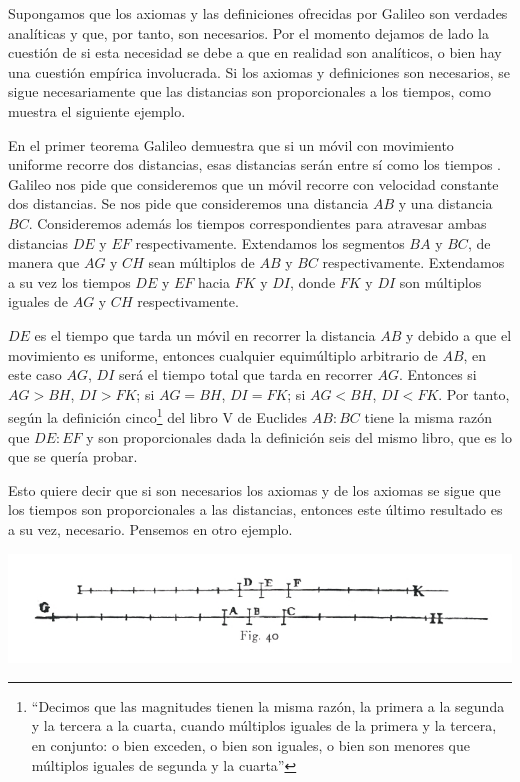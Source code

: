Supongamos que los axiomas y las definiciones ofrecidas por Galileo son verdades analíticas y que, por tanto, son necesarios. Por el momento dejamos de lado la cuestión de si esta necesidad se debe a que en realidad son analíticos, o bien hay una cuestión empírica involucrada. Si los axiomas y definiciones son necesarios, se sigue necesariamente que las distancias son proporcionales a los tiempos, como muestra el siguiente ejemplo.

En el primer teorema Galileo demuestra que si un móvil con movimiento uniforme recorre dos distancias, esas distancias serán entre sí como los tiempos \cite[p. 215]{galtre}. Galileo nos pide que consideremos que un móvil recorre con velocidad constante dos distancias. Se nos pide que consideremos una distancia $AB$ y una distancia $BC$. Consideremos además los tiempos correspondientes para atravesar ambas distancias $DE$ y $EF$ respectivamente. Extendamos los segmentos $BA$ y $BC$, de manera que $AG$ y $CH$ sean múltiplos de $AB$ y $BC$ respectivamente. Extendamos a su vez los tiempos $DE$ y $EF$ hacia $FK$ y $DI$, donde $FK$ y $DI$ son múltiplos iguales de $AG$ y $CH$ respectivamente.

$DE$ es el tiempo que tarda un móvil en recorrer la distancia $AB$ y debido a que el movimiento es uniforme, entonces cualquier equimúltiplo arbitrario de $AB$, en este caso $AG$, $DI$ será el tiempo total que tarda en recorrer $AG$. Entonces si $AG > BH$, $DI > FK$; si $AG = BH$, $DI = FK$; si $AG < BH$, $DI < FK$. Por tanto, según la definición cinco\footnote{``Decimos que las magnitudes tienen la misma razón, la primera a la segunda y  la tercera a la cuarta, cuando múltiplos iguales de la primera y la tercera, en conjunto: o bien exceden, o bien son iguales, o bien son menores que múltiplos iguales de segunda y la cuarta''} del libro V de Euclides \cite{Euclides1956} $AB:BC$ tiene la misma razón que $DE:EF$ y son proporcionales dada la definición seis del mismo libro, que es lo que se quería probar.

Esto quiere decir que si son necesarios los axiomas y de los axiomas se sigue que los tiempos son proporcionales a las distancias, entonces este último resultado es a su vez, necesario. Pensemos en otro ejemplo.

\includegraphics[width=\textwidth]{fig40.jpg}

